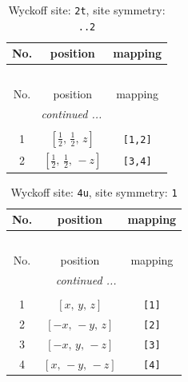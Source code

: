 \documentclass[fleqn,8pt]{jsarticle}
\begin{document}
\begin{longtable}{ccc}
\caption{Wyckoff site: {\tt 2t}, site symmetry: {\tt ..2}}
 \\
 \hline \hline
No. & position & mapping \\ \hline \endfirsthead

\multicolumn{2}{l}{\tablename\ \thetable{}} \\
 \hline \hline
No. & position & mapping \\ \hline \endhead

 \hline \hline
\multicolumn{2}{r}{\footnotesize\it continued ...} \\ \endfoot

 \hline \hline
\multicolumn{2}{r}{} \\ \endlastfoot

1 & $\left[ \frac{1}{2},\, \frac{1}{2},\, z \right]$ & {\tt [1,2]} \\ \hline
2 & $\left[ \frac{1}{2},\, \frac{1}{2},\, - z \right]$ & {\tt [3,4]} \\
\end{longtable}
\renewcommand{\arraystretch}{1.2}
\begin{longtable}{ccc}
\caption{Wyckoff site: {\tt 4u}, site symmetry: {\tt 1}}
 \\
 \hline \hline
No. & position & mapping \\ \hline \endfirsthead

\multicolumn{2}{l}{\tablename\ \thetable{}} \\
 \hline \hline
No. & position & mapping \\ \hline \endhead

 \hline \hline
\multicolumn{2}{r}{\footnotesize\it continued ...} \\ \endfoot

 \hline \hline
\multicolumn{2}{r}{} \\ \endlastfoot

1 & $\left[ x,\, y,\, z \right]$ & {\tt [1]} \\ \hline
2 & $\left[ - x,\, - y,\, z \right]$ & {\tt [2]} \\ \hline
3 & $\left[ - x,\, y,\, - z \right]$ & {\tt [3]} \\ \hline
4 & $\left[ x,\, - y,\, - z \right]$ & {\tt [4]} \\
\end{longtable}
\end{document}
